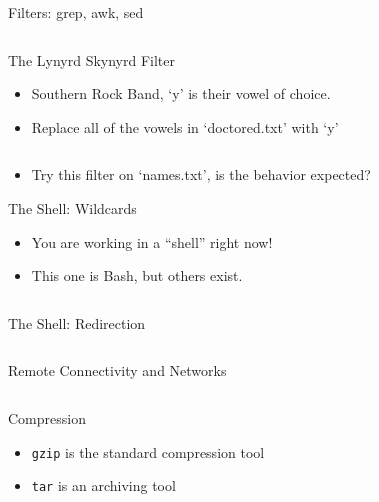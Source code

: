 \documentclass[hyperref={pdfpagelabels=false},12pt]{beamer}
\newcommand{\myvbutton}[2]{\vfill\hyperlink{#1}{\beamerbutton{{#2}}}}
\begin{document}
\begin{frame}[label=grep-awk-sed]{Filters: grep, awk, sed}
\inputminted[bgcolor=lightgray,linenos,fontsize=\footnotesize]{bash}{code/simple-filters-3.txt}
\end{frame}

\begin{frame}[label=lynyrd]{The Lynyrd Skynyrd Filter}
\begin{itemize}
    \item Southern Rock Band, `y' is their vowel of choice.
    \item Replace all of the vowels in `doctored.txt' with `y'
\end{itemize}
\inputminted[bgcolor=lightgray,linenos,fontsize=\footnotesize]{bash}{code/simple-filters-4.txt}
\begin{itemize}
    \item Try this filter on `names.txt', is the behavior expected?
\end{itemize}
\end{frame}

\begin{frame}[label=wildcards]{The Shell: Wildcards}
\begin{itemize}
    \item You are working in a ``shell'' right now!
    \item This one is Bash, but others exist.
\end{itemize}
\inputminted[bgcolor=lightgray,linenos,fontsize=\footnotesize]{bash}{code/shell-1.txt}
\myvbutton{exercises}{Exercises (2)}
\end{frame}

\begin{frame}[label=redirection]{The Shell: Redirection}
\inputminted[bgcolor=lightgray,linenos,fontsize=\footnotesize]{bash}{code/shell-2.txt}
\end{frame}

\begin{frame}[label=ssh]{Remote Connectivity and Networks}
\inputminted[bgcolor=lightgray,linenos,fontsize=\footnotesize]{bash}{code/ssh-config-1.txt}
\end{frame}

\begin{frame}[label=compression]{Compression}
\begin{itemize}
    \item \texttt{gzip} is the standard compression tool
    \item \texttt{tar} is an archiving tool
\end{itemize}
\inputminted[bgcolor=lightgray,linenos,fontsize=\footnotesize]{bash}{code/compression-1.txt}
\end{frame}
\end{document}
